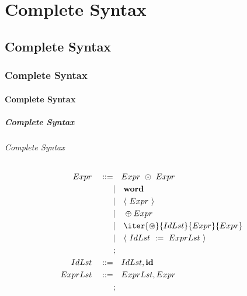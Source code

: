 \documentclass[10pt]{report}
\newcommand{\word}{\textbf{word}}
\newcommand{\ID}{\textbf{id}}
\newcounter{i}
\newcommand{\division}[2]{
	\setcounter{i}{1}
	\ifthenelse{#1 = \value{i}} {
		\chapter{#2}
	} {}
	\stepcounter{i}
	\ifthenelse{#1 = \value{i}} {
		\section{#2}
	} {}
	\stepcounter{i}
	\ifthenelse{#1 = \value{i}} {
		\subsection{#2}
	} {}
	\stepcounter{i}
	\ifthenelse{#1 = \value{i}} {
		\subsubsection{#2}
	} {}
	\stepcounter{i}
	\ifthenelse{#1 = \value{i}} {
		\paragraph{#2}
	} {}
	\stepcounter{i}
	\ifthenelse{#1 = \value{i}} {
		\subparagraph{#2}
	} {}
	\stepcounter{i}
}
\begin{document}
\division{1}{Complete Syntax}

\begin{align*}
		Expr \quad ::= & \quad Expr  \ \odot \ Expr  \\
		& | \quad \word \\
		& | \quad \langle \ Expr \ \rangle \\
		& | \quad \oplus Expr \\
		& | \quad \iter{\circledast}{IdLst}{Expr}{Expr} \\
		& | \quad \langle \ IdLst \ := \ ExprLst \ \rangle \\
		& ; \\
		IdLst \quad ::= & \quad IdLst, \ID \\
		ExprLst \quad ::= & \quad ExprLst, Expr \\
		& ; 
\end{align*}
\end{document}
